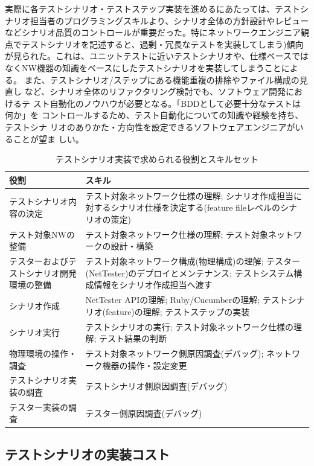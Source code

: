 実際に各テストシナリオ・テストステップ実装を進めるにあたっては、テストシ
ナリオ担当者のプログラミングスキルより、シナリオ全体の方針設計やレビュー
などシナリオ品質のコントロールが重要だった。特にネットワークエンジニア観
点でテストシナリオを記述すると、過剰・冗長なテストを実装してしまう)傾向
が見られた。これは、ユニットテストに近いテストシナリオや、仕様ベースでは
なくNW機器の知識をベースにしたテストシナリオを実装してしまうことによる。
また、テストシナリオ/ステップにある機能重複の排除やファイル構成の見直し
など、シナリオ全体のリファクタリング検討でも、ソフトウェア開発におけるテ
スト自動化のノウハウが必要となる。「BDDとして必要十分なテストは何か」を
コントロールするため、テスト自動化についての知識や経験を持ち、テストシナ
リオのありかた・方向性を設定できるソフトウェアエンジニアがいることが望ま
しい。

\begin{table}[h]
 \centering
 \caption{テストシナリオ実装で求められる役割とスキルセット}
 \label{tab:skillset}
 \begin{tabular}[t]{p{}|p{}}
  \hline
  役割 & スキル \\
  \hline
  \hline
  テストシナリオ内容の決定 & テスト対象ネットワーク仕様の理解; シナリオ作成担当に対するシナリオ仕様を決定する(feature fileレベルのシナリオの策定) \\ \hline
  テスト対象NWの整備 & テスト対象ネットワーク仕様の理解; テスト対象ネットワークの設計・構築 \\ \hline
  テスターおよびテストシナリオ開発環境の整備 & テスト対象ネットワーク構成(物理構成)の理解; テスター(NetTester)のデプロイとメンテナンス; テストシステム構成情報をシナリオ作成担当へ渡す \\ \hline
  シナリオ作成 & NetTester APIの理解; Ruby/Cucumberの理解; テストシナリオ(feature)の理解; テストステップの実装 \\ \hline
  シナリオ実行 & テストシナリオの実行; テスト対象ネットワーク仕様の理解; テスト結果の判断 \\ \hline
  物理環境の操作・調査 & テスト対象ネットワーク側原因調査(デバッグ); ネットワーク機器の操作・設定変更 \\ \hline
  テストシナリオ実装の調査 & テストシナリオ側原因調査(デバッグ) \\ \hline
  テスター実装の調査 & テスター側原因調査(デバッグ) \\ \hline
 \end{tabular}
\end{table}

  \subsection{テストシナリオの実装コスト}

